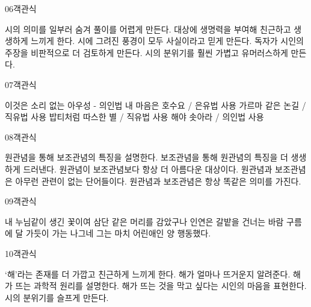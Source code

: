 \documentclass[fs9,seriesFre]{korfarm-base}
\begin{document}
\begin{kfQBlock}{06}{객관식}
\begin{kfChoices}
\kfChoice 시의 의미를 일부러 숨겨 풀이를 어렵게 만든다.
\kfChoice 대상에 생명력을 부여해 친근하고 생생하게 느끼게 한다.
\kfChoice 시에 그려진 풍경이 모두 사실이라고 믿게 만든다.
\kfChoice 독자가 시인의 주장을 비판적으로 더 검토하게 만든다.
\kfChoice 시의 분위기를 훨씬 가볍고 유머러스하게 만든다.
\end{kfChoices}
\end{kfQBlock}
\begin{kfQBlock}{07}{객관식}
\begin{kfChoices}
\kfChoice 이것은 소리 없는 아우성 - 의인법
\kfChoice 내 마음은 호수요 / 은유법 사용
\kfChoice 가르마 같은 논길 / 직유법 사용
\kfChoice 밥티처럼 따스한 별 / 직유법 사용
\kfChoice 해야 솟아라 / 의인법 사용
\end{kfChoices}
\end{kfQBlock}
\begin{kfQBlock}{08}{객관식}
\begin{kfChoices}
\kfChoice 원관념을 통해 보조관념의 특징을 설명한다.
\kfChoice 보조관념을 통해 원관념의 특징을 더 생생하게 드러낸다.
\kfChoice 원관념이 보조관념보다 항상 더 아름다운 대상이다.
\kfChoice 원관념과 보조관념은 아무런 관련이 없는 단어들이다.
\kfChoice 원관념과 보조관념은 항상 똑같은 의미를 가진다.
\end{kfChoices}
\end{kfQBlock}
\begin{kfQBlock}{09}{객관식}
\begin{kfChoices}
\kfChoice 내 누님같이 생긴 꽃이여
\kfChoice 삼단 같은 머리를 감았구나
\kfChoice 인연은 갈밭을 건너는 바람
\kfChoice 구름에 달 가듯이 가는 나그네
\kfChoice 그는 마치 어린애인 양 행동했다.
\end{kfChoices}
\end{kfQBlock}
\begin{kfQBlock}{10}{객관식}
\begin{kfChoices}
\kfChoice ‘해’라는 존재를 더 가깝고 친근하게 느끼게 한다.
\kfChoice 해가 얼마나 뜨거운지 알려준다.
\kfChoice 해가 뜨는 과학적 원리를 설명한다.
\kfChoice 해가 뜨는 것을 막고 싶다는 시인의 마음을 표현한다.
\kfChoice 시의 분위기를 슬프게 만든다.
\end{kfChoices}
\end{kfQBlock}
\end{document}

